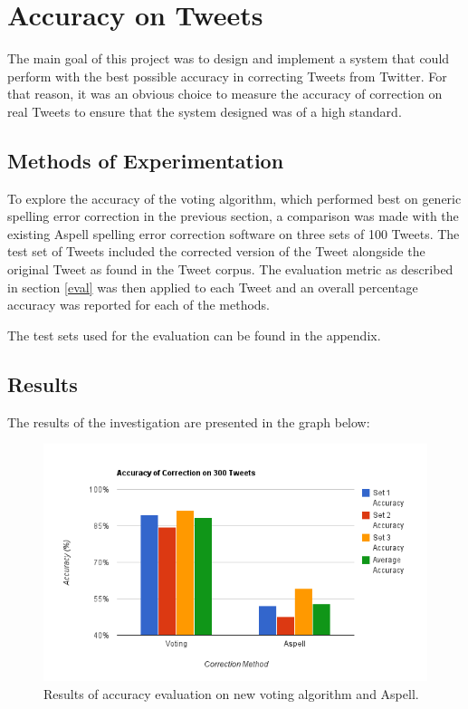 \section{Accuracy on Tweets}
The main goal of this project was to design and implement a system that could perform with the best possible accuracy in correcting Tweets from Twitter. For that reason, it was an obvious choice to measure the accuracy of correction on real Tweets to ensure that the system designed was of a high standard.

\subsection{Methods of Experimentation}
To explore the accuracy of the voting algorithm, which performed best on generic spelling error correction in the previous section, a comparison was made with the existing Aspell spelling error correction software on three sets of 100 Tweets. The test set of Tweets included the corrected version of the Tweet alongside the original Tweet as found in the Tweet corpus. The evaluation metric as described in section \ref{eval} was then applied to each Tweet and an overall percentage accuracy was reported for each of the methods.

The test sets used for the evaluation can be found in the appendix.

\subsection{Results}
The results of the investigation are presented in the graph below:

\begin{figure}[!h]
	\centering
	\label{fig:accuracychart}
	\includegraphics[scale=0.6]{images/accuracychart}
	\caption{Results of accuracy evaluation on new voting algorithm and Aspell.}
\end{figure}

